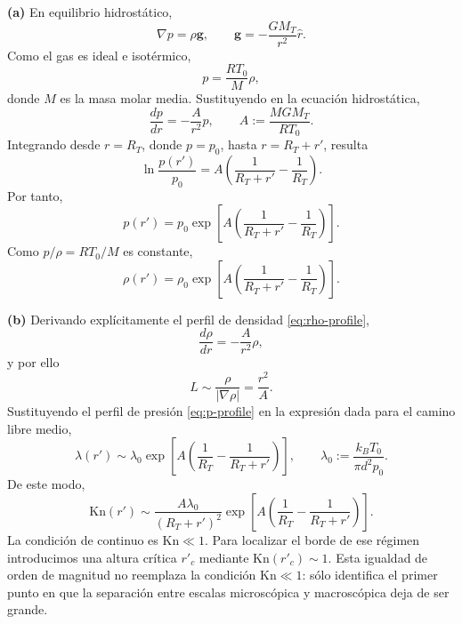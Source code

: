 \documentclass[12pt]{article}
\begin{document}
\textbf{(a)} En equilibrio hidrostático,
\begin{equation}
\nabla p=\rho\bm g,
\qquad
\bm g=-\frac{GM_T}{r^2}\hat r.
\end{equation}
Como el gas es ideal e isotérmico,
\begin{equation}
p=\frac{RT_0}{M}\rho,
\end{equation}
donde $M$ es la masa molar media. Sustituyendo en la ecuación hidrostática,
\begin{equation}
\frac{dp}{dr}=-\frac{A}{r^2}p,
\qquad
A:=\frac{MGM_T}{RT_0}.
\end{equation}
Integrando desde $r=R_T$, donde $p=p_0$, hasta $r=R_T+r'$, resulta
\begin{equation}
\ln\frac{p(r')}{p_0}=A\left(\frac{1}{R_T+r'}-\frac1{R_T}\right).
\end{equation}
Por tanto,
\begin{equation}
\boxed{p(r')=p_0\exp\left[A\left(\frac{1}{R_T+r'}-\frac1{R_T}\right)\right]}.\label{eq:p-profile}
\end{equation}
Como $p/\rho=RT_0/M$ es constante,
\begin{equation}
\boxed{\rho(r')=\rho_0\exp\left[A\left(\frac{1}{R_T+r'}-\frac1{R_T}\right)\right]}.\label{eq:rho-profile}
\end{equation}

\textbf{(b)} Derivando explícitamente el perfil de densidad \eqref{eq:rho-profile},
\begin{equation}
\frac{d\rho}{dr}=-\frac{A}{r^2}\rho,
\end{equation}
y por ello
\begin{equation}
L\sim\frac{\rho}{|\nabla\rho|}=\frac{r^2}{A}.
\end{equation}
Sustituyendo el perfil de presión \eqref{eq:p-profile} en la expresión dada para el camino libre medio,
\begin{equation}
\lambda(r')\sim\lambda_0\exp\left[A\left(\frac1{R_T}-\frac{1}{R_T+r'}\right)\right],
\qquad
\lambda_0:=\frac{k_BT_0}{\pi d^2p_0}.
\end{equation}
De este modo,
\begin{equation}
\boxed{\mathrm{Kn}(r')\sim
\frac{A\lambda_0}{(R_T+r')^2}
\exp\left[A\left(\frac1{R_T}-\frac{1}{R_T+r'}\right)\right]}.
\end{equation}
La condición de continuo es $\mathrm{Kn}\ll1$. Para localizar el borde de ese régimen introducimos una altura crítica $r'_c$ mediante $\mathrm{Kn}(r'_c)\sim1$. Esta igualdad de orden de magnitud no reemplaza la condición $\mathrm{Kn}\ll1$: sólo identifica el primer punto en que la separación entre escalas microscópica y macroscópica deja de ser grande.
\end{document}
